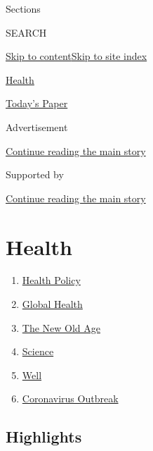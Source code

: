 Sections

SEARCH

\protect\hyperlink{site-content}{Skip to
content}\protect\hyperlink{site-index}{Skip to site index}

\href{https://www.nytimes.com/section/health}{Health}

\href{https://myaccount.nytimes.com/auth/login?response_type=cookie\&client_id=vi}{}

\href{https://www.nytimes.com/section/todayspaper}{Today's Paper}

Advertisement

\protect\hyperlink{after-top}{Continue reading the main story}

Supported by

\protect\hyperlink{after-sponsor}{Continue reading the main story}

\hypertarget{health}{%
\section{Health}\label{health}}

\begin{enumerate}
\def\labelenumi{\arabic{enumi}.}
\tightlist
\item
  \href{/section/health/policy}{Health Policy}
\item
  \href{/column/global-health}{Global Health}
\item
  \href{/column/the-new-old-age}{The New Old Age}
\item
  \href{/section/science}{Science}
\item
  \href{/section/well/}{Well}
\item
  \href{/news-event/coronavirus}{Coronavirus Outbreak}
\end{enumerate}

\hypertarget{highlights}{%
\subsection{Highlights}\label{highlights}}

